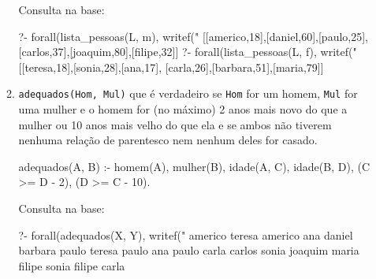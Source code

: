 \documentclass[10pt, twoside]{article}          %
\newenvironment{proof*}[1][proof*]              %
  {\proof[#1]\vspace{0.5em}\vspace*{-\baselineskip}
  \hspace{\parindent}\leftskip=.5cm\rightskip=.5cm}
  {\vspace*{-1.5\baselineskip}
  
  \rightskip=0cm\endproof}
\begin{document}
\begin{multicols*}{2}
\begin{enumerate}
\begin{proof*}[\unskip\nopunct]
\begin{enumerate}
        Consulta na base:
        \begin{pseudocode}[gobble=10]
          ?- forall(lista_pessoas(L, m), writef("%
          [[americo,18],[daniel,60],[paulo,25],
           [carlos,37],[joaquim,80],[filipe,32]]
          ?- forall(lista_pessoas(L, f), writef("%
          [[teresa,18],[sonia,28],[ana,17],
           [carla,26],[barbara,51],[maria,79]]
        \end{pseudocode}

      \item \texttt{adequados(Hom, Mul)} que é verdadeiro se \texttt{Hom} for um homem, 
      \texttt{Mul} for uma mulher e o homem for (no máximo) 2 anos mais novo do que a mulher ou 10 
      anos mais velho do que ela e se ambos não tiverem nenhuma relação de parentesco nem nenhum 
      deles for casado.

        \begin{pseudocode}[gobble=10]
          adequados(A, B) :-
              homem(A),
              mulher(B),
              idade(A, C),
              idade(B, D),
              (C >= D - 2),
              (D >= C - 10).
        \end{pseudocode}

        Consulta na base:
        \begin{pseudocode}[gobble=10]
          ?- forall(adequados(X, Y), writef("%
          americo teresa
          americo ana
          daniel barbara
          paulo teresa
          paulo ana
          paulo carla
          carlos sonia
          joaquim maria
          filipe sonia
          filipe carla
        \end{pseudocode}

    \end{enumerate}
  \end{proof*}

\end{enumerate}
\end{multicols*}
\end{document}
